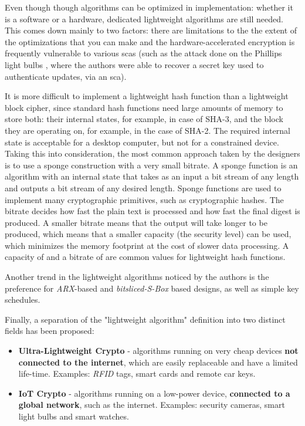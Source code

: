 \documentclass{llncs}
\begin{document}
Even though though algorithms can be optimized in implementation: whether it is
a software or a hardware, dedicated lightweight algorithms are still needed.
This comes down mainly to two factors: there are limitations to the the extent of
the optimizations that you can make and the hardware-accelerated encryption is
frequently vulnerable to various \gls{sca}s (such as the attack done on the
Phillips light bulbs \cite{cryptoeprint:2016:1047}, where the authors were able to
recover a secret key used to authenticate updates, via an \gls{sca}).

It is more difficult to implement a lightweight hash function than a lightweight
block cipher, since standard hash functions need large amounts
of memory to store both: their internal states, for example,  in case of SHA-3,
and the block they are operating on, for example,  in the case of SHA-2.
The required internal state is acceptable for a desktop computer, but not for a
constrained device. Taking this into consideration, the most common approach
taken by the designers is to use a sponge construction with a very small bitrate.
A sponge function is an algorithm with an internal state that takes as an input
a bit stream of any length and outputs a bit stream of any desired length. Sponge
functions are used to implement many cryptographic primitives, such as cryptographic
hashes. The bitrate decides how fast the plain text is processed and how fast the
final digest is produced. A smaller bitrate means that the output will take longer
to be produced, which means that a smaller capacity (the security level)
can be used, which minimizes the memory footprint at the cost of slower data
processing. A capacity of  and a bitrate of 
are common values for lightweight hash functions.

Another trend in the lightweight algorithms noticed by the authors is the
preference for \textit{ARX}-based and \textit{bitsliced-S-Box} based designs, as well as simple key schedules.

Finally, a separation of the "lightweight algorithm" definition into two distinct fields has been proposed:

\begin{itemize}
  \item \textbf{Ultra-Lightweight Crypto} - algorithms running on very cheap
  devices \textbf{not connected to the internet}, which are easily replaceable
  and have a limited life-time. Examples: \textit{RFID} tags, smart cards and remote car keys.
  \item \textbf{IoT Crypto} - algorithms running on a low-power device,
  \textbf{connected to a global network}, such as the internet. Examples: security cameras, smart light bulbs and smart watches.
\end{itemize}
\end{document}
